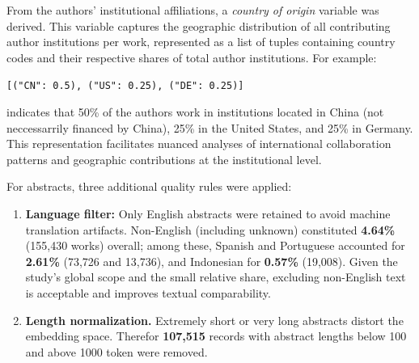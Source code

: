 \documentclass{article}
\begin{document}
From the authors' institutional affiliations, a \textit{country of origin} variable was derived. This variable captures the geographic distribution of all contributing author institutions per work, represented as a list of tuples containing country codes and their respective shares of total author institutions. For example:
\begin{center}
	\texttt{[("CN": 0.5), ("US": 0.25), ("DE": 0.25)]}
\end{center}
indicates that 50\% of the authors work in institutions located in China (not neccessarrily financed by China), 25\% in the United States, and 25\% in Germany. This representation facilitates nuanced analyses of international collaboration patterns and geographic contributions at the institutional level.

For abstracts, three additional quality rules were applied:
\begin{enumerate}
	\item \textbf{Language filter:} Only English abstracts were retained to avoid machine translation artifacts. Non-English (including unknown) constituted \textbf{4.64\%} (155{,}430 works) overall; among these, Spanish and Portuguese accounted for \textbf{2.61\%} (73{,}726 and 13{,}736), and Indonesian for \textbf{0.57\%} (19{,}008). Given the study’s global scope and the small relative share, excluding non-English text is acceptable and improves textual comparability.
	\item \textbf{Length normalization.} Extremely short or very long abstracts distort the embedding space. Therefor \textbf{107{,}515} records with abstract lengths below 100 and above 1000 token were removed. 
\end{enumerate}

\end{document}
